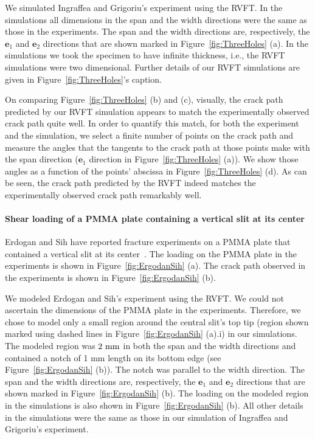 \documentclass[11pt,letterpaper]{report}
\begin{document}
\begin{enumerate}[label=\textit{2.\arabic*},wide, labelwidth=!, labelindent=0pt]
	We simulated Ingraffea and Grigoriu's  experiment using the  RVFT. %
	In the simulations all dimensions in the span and the width directions  were the same as those  in the experiments. %
	The span and the width directions are, respectively, the $\boldsymbol{e}_1$ and $\boldsymbol{e}_2$ directions that are shown marked in Figure~\ref{fig:ThreeHoles} (a). %
	In the simulations we took the specimen to have infinite thickness, i.e., the RVFT simulations were two dimensional. %
	Further details of our RVFT simulations are given in Figure~\ref{fig:ThreeHoles}'s caption. %

On comparing Figure~\ref{fig:ThreeHoles} (b) and (c), visually, the crack path predicted by our RVFT simulation appears to match the experimentally observed crack path quite well. %
In order to quantify this match, for both the experiment and the simulation,  we select a finite number of points on the crack path and measure the angles that the tangents to the crack path at those points make with  the span direction ($\boldsymbol{e}_1$ direction in Figure~\ref{fig:ThreeHoles} (a)). %
We show those angles as a function of the points' abscissa in Figure~\ref{fig:ThreeHoles} (d). %
As can be seen, the crack path predicted by the RVFT indeed matches the experimentally observed crack path remarkably well. %

 


\paragraph{Shear loading of a PMMA plate containing a vertical slit at its center} %
Erdogan and Sih have reported fracture experiments  on a  PMMA plate that contained a vertical slit at its center~\cite{erdogan1963crack}. %
The loading on the PMMA plate in the experiments is shown in Figure~\ref{fig:ErgodanSih} (a). %
The crack path observed in the experiments is shown in Figure~\ref{fig:ErgodanSih} (b). %

We modeled Erdogan and Sih's experiment using the RVFT. %
We could not ascertain the dimensions of the  PMMA plate in the experiments. %
Therefore, we chose to model only a small region around the central slit's top tip (region shown marked using dashed lines in Figure~\ref{fig:ErgodanSih} (a).i) in our simulations. %
The modeled region was   $2~\rm mm$ in both the span and the width directions and contained a notch of 1 mm length on its bottom edge (see Figure~\ref{fig:ErgodanSih} (b)). %
The notch was parallel to the width direction. %
The span and the width directions are, respectively, the $\boldsymbol{e}_1$ and $\boldsymbol{e}_2$ directions that are shown marked in Figure~\ref{fig:ErgodanSih} (b). %
The loading on the modeled region in the simulations is also shown in  Figure~\ref{fig:ErgodanSih} (b). %
All other details in the simulations were the same as those in our simulation of Ingraffea and Grigoriu's  experiment. %




\end{enumerate}
\end{document}
